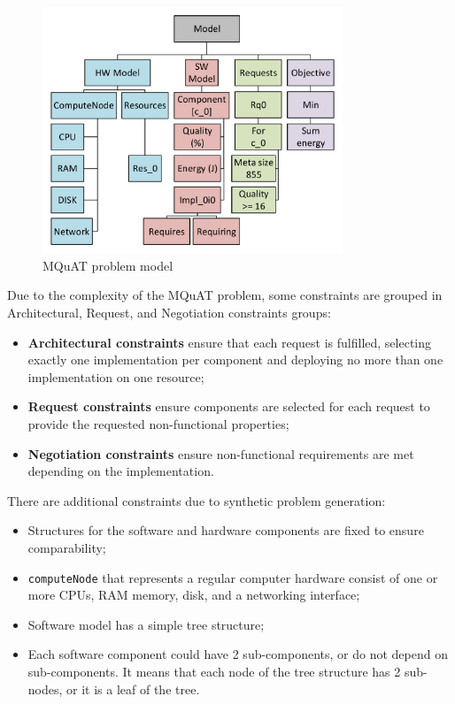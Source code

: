 \begin{figure}
	\centering
	\includegraphics[width=0.8\textwidth]{images/MQuATModel.pdf}
	\caption[MQuAT problem model]{MQuAT problem model}
	\label{fig:mquatmodel}
\end{figure}


Due to the complexity of the MQuAT problem, some constraints are grouped in Architectural, Request, and Negotiation constraints groups:

\begin{itemize}
	\item \textbf{Architectural constraints} ensure that each request is fulfilled, selecting exactly one implementation per component and deploying no more than one implementation on one resource;
	\item \textbf{Request constraints} ensure components are selected for each request to provide the requested non-functional properties;
	\item \textbf{Negotiation constraints} ensure non-functional requirements are met depending on the implementation.
\end{itemize}

There are additional constraints due to synthetic problem generation:

\begin{itemize}
	\item Structures for the software and hardware components are fixed to ensure comparability;
	\item \texttt{computeNode} that represents a regular computer hardware consist of one or more CPUs, RAM memory, disk, and a networking interface;
	\item Software model has a simple tree structure;
	\item Each software component could have 2 sub-components, or do not depend on sub-components. It means that each node of the tree structure has 2 sub-nodes, or it is a leaf of the tree.
\end{itemize}

